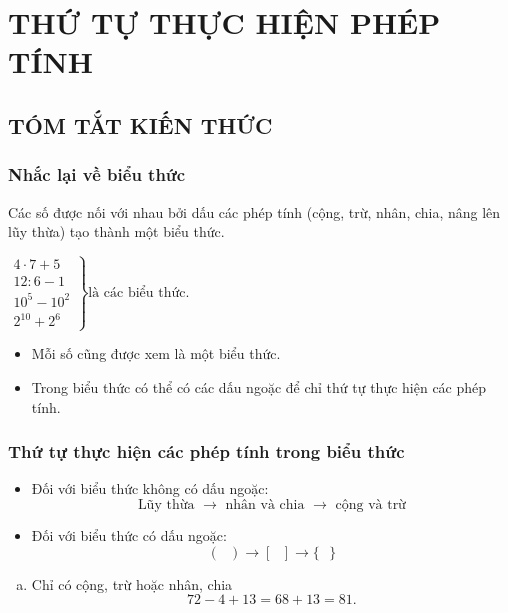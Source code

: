 \section{THỨ TỰ THỰC HIỆN PHÉP TÍNH}
\subsection{TÓM TẮT KIẾN THỨC}
\begin{tomtat}
	\subsubsection{Nhắc lại về biểu thức}
Các số được nối với nhau bởi dấu các phép tính (cộng, trừ, nhân, chia, nâng lên lũy thừa) tạo thành một biểu thức.
\begin{vd}
$\left. \begin{array}{l}
4 \cdot 7 + 5\\
12:6 - 1\\
{10^5} - {10^2}\\
{2^{10}} + {2^6}
\end{array} \right\}\text{là các biểu thức.}$\end{vd}
\begin{note}
\begin{itemize}
\item Mỗi số cũng được xem là một biểu thức.
\item Trong biểu thức có thể có các dấu ngoặc để chỉ thứ tự thực hiện các phép tính.
\end{itemize}
\end{note}
	\subsubsection{Thứ tự thực hiện các phép tính trong biểu thức}
\begin{itemize}
\item Đối với biểu thức không có dấu ngoặc:
\[\text{Lũy thừa $\longrightarrow$ nhân và chia $\longrightarrow$ cộng và trừ}\]
\item Đối với biểu thức có dấu ngoặc:\\
\[\left( \text{ }\right) \longrightarrow \left[ \text{ }\right] \longrightarrow \{ \text{ }\}\]
\end{itemize}
\begin{vd}
\begin{enumerate}[a)]
	\item Chỉ  có cộng, trừ hoặc nhân, chia
	\[72 - 4 + 13 = 68 + 13 = 81.\]
			

\end{enumerate}
\end{vd}
\end{tomtat}

